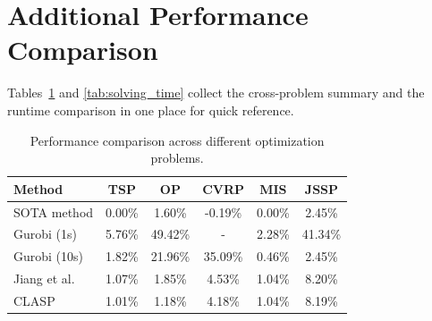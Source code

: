 \documentclass{article}
\theoremstyle{remark}
\begin{document}
\begin{table}[!ht]
\centering
\caption{Optimality gap comparison of LLM-based methods on TSPLIB instances. CLASP uses normalized-coordinate TSPLIB prompts; reported CLASP gaps are recomputed on the original TSPLIB coordinates with \texttt{EUC\_2D} rounded distances.}
\label{tab:tsplib_gap_comparison_clasp}
\end{table}

\clearpage
\section{Additional Performance Comparison}
\label{app:performance-comparison}

Tables~\ref{tab:performance_comparison} and \ref{tab:solving_time} collect the cross-problem summary and the runtime comparison in one place for quick reference.

\begin{table}[!t]
\centering
\caption{Performance comparison across different optimization problems.}
\label{tab:performance_comparison}
\begin{tabular}{lccccc}
\toprule
Method & TSP & OP & CVRP & MIS & JSSP \\
\midrule
SOTA method & 0.00\% & 1.60\% & -0.19\% & 0.00\% & 2.45\% \\
Gurobi (1s)      & 5.76\% & 49.42\% & - & 2.28\% & 41.34\% \\
Gurobi (10s)     & 1.82\% & 21.96\% & 35.09\% & 0.46\% & 2.45\% \\
Jiang et al.     & 1.07\% & 1.85\% & 4.53\% & 1.04\% & 8.20\% \\
CLASP            & 1.01\% & 1.18\% & 4.18\% & 1.04\% & 8.19\% \\
\bottomrule
\end{tabular}
\end{table}
\end{document}
